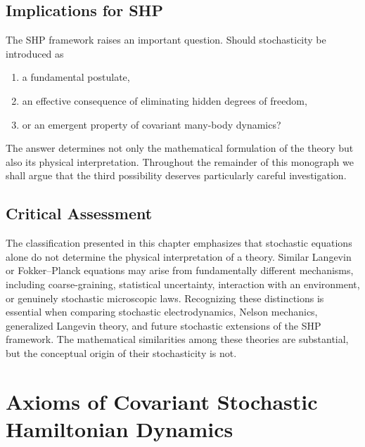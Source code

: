 \section{Implications for SHP}
The SHP framework raises an important question.
Should stochasticity be introduced as
\begin{enumerate}
\item
a fundamental postulate,
\item
an effective consequence of eliminating hidden degrees of freedom,
\item
or an emergent property of covariant many-body dynamics?
\end{enumerate}
The answer determines not only the mathematical formulation of the
theory but also its physical interpretation.
Throughout the remainder of this monograph we shall argue that the third
possibility deserves particularly careful investigation.
\section*{Critical Assessment}
The classification presented in this chapter emphasizes that stochastic
equations alone do not determine the physical interpretation of a
theory. Similar Langevin or Fokker--Planck equations may arise from
fundamentally different mechanisms, including coarse-graining,
statistical uncertainty, interaction with an environment, or genuinely
stochastic microscopic laws.
Recognizing these distinctions is essential when comparing stochastic
electrodynamics, Nelson mechanics, generalized Langevin theory, and
future stochastic extensions of the SHP framework. The mathematical
similarities among these theories are substantial, but the conceptual
origin of their stochasticity is not.
\chapter{Axioms of Covariant Stochastic Hamiltonian Dynamics}
\label{ch:CSHTAxioms}
